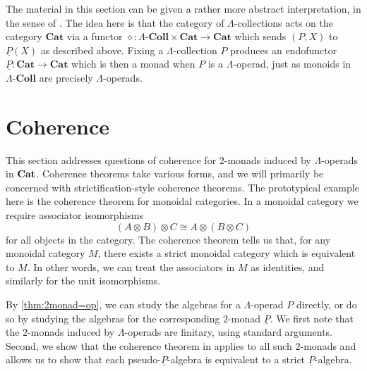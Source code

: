 \begin{rem}
The material in this section can be given a rather more abstract interpretation, in the sense of \cite{KL97}. The idea here is that the category of $\Lambda$-collections acts on the category $\mathbf{Cat}$ via a functor $\diamond \colon \Lambda\text{-}\mathbf{Coll} \times \mathbf{Cat} \rightarrow \mathbf{Cat}$ which sends $(P,X)$ to $\underline{P}(X)$ as described above. Fixing a $\Lambda$-collection $P$ produces an endofunctor $\underline{P} \colon \mathbf{Cat} \rightarrow \mathbf{Cat}$ which is then a monad when $P$ is a $\Lambda$-operad, just as monoids in $\Lambda\text{-}\mathbf{Coll}$ are precisely $\Lambda$-operads.
\end{rem}

\section{Coherence}

This section addresses questions of coherence for $2$-monads induced by $\Lambda$-operads in $\mathbf{Cat}$. Coherence theorems take various forms, and we will primarily be concerned with strictification-style coherence theorems. The prototypical example here is the coherence theorem for monoidal categories. In a monoidal category we require associator isomorphisms
    \[
        \left( A \otimes B \right) \otimes C \cong A \otimes \left( B \otimes C \right)
    \]
for all objects in the category. The coherence theorem tells us that, for any monoidal category $M$, there exists a strict monoidal category which is equivalent to $M$. In other words, we can treat the associators in $M$ as identities, and similarly for the unit isomorphisms.



By \cref{thm:2monad=op}, we can study the algebras for a $\Lambda$-operad $P$ directly, or do so by studying the algebras for the corresponding $2$-monad $\underline{P}$. We first note that the $2$-monads induced by $\Lambda$-operads are finitary, using standard arguments. Second, we show that the coherence theorem in \cite{lack-cod} applies to all such $2$-monads and allows us to show that each pseudo-$\underline{P}$-algebra is equivalent to a strict $\underline{P}$-algebra. 

